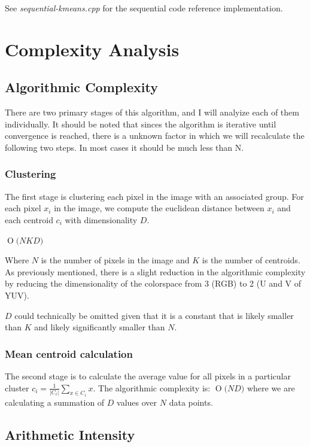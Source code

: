 \documentclass[11pt]{article}
\newcommand{\BigO}[1]{\ensuremath{\operatorname{O}\bigl(#1\bigr)}}
\begin{document}
See \emph{sequential-kmeans.cpp} for the sequential code reference implementation.

\section{Complexity Analysis}

\subsection{Algorithmic Complexity}

There are two primary stages of this algorithm, and I will analyize each of them individually.
It should be noted that sinces the algorithm is iterative until convergence is reached, there
is a unknown factor in which we will recalculate the following two steps. In most cases it
should be much less than N.

\subsubsection{Clustering}

The first stage is clustering each pixel in the image with an associated group. For
each pixel $x_i$ in the image, we compute the euclidean distance between $x_i$
and each centroid $c_i$ with dimensionality $D$.

$\BigO{NKD}$

Where $N$ is the number of pixels in the image and $K$ is the number of centroids. As
previously mentioned, there is a slight reduction in the algorithmic complexity by
reducing the dimensionality of the colorspace from 3 (RGB) to 2 (U and V of YUV).

$D$ could technically be omitted given that it is a constant that is likely smaller
than $K$ and likely significantly smaller than $N$.

\subsubsection{Mean centroid calculation}

The second stage is to calculate the average value for all pixels in a particular cluster $c_i = \frac{1}{|C_i|}\sum_{x \in C_i}x$. The algorithmic complexity is: $\BigO{ND}$ where we are calculating a summation of $D$ values over $N$ data points.

\subsection{Arithmetic Intensity}
\end{document}
